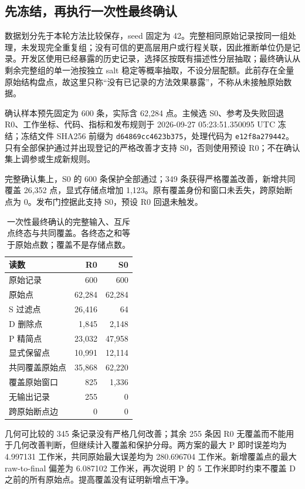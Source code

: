 \subsection{先冻结，再执行一次性最终确认}
数据划分先于本轮方法比较保存，seed 固定为 42。完整相同原始记录按同一组处理，未发现完全重复组；没有可信的更高层用户或行程关联，因此推断单位仍是记录。开发区使用已经暴露的历史记录，选择区按既有描述性分层抽取；最终确认从剩余完整组的单一池按独立 salt 稳定等概率抽取，不设分层配额。此前存在全量原始结构盘点，故这里只称“没有已记录的方法效果暴露”，不称从未接触原始数据。

确认样本预先固定为 600 条，实际含 62,284 点。主候选 S0、参考及失败回退 R0、工作坐标、代码、指标和发布规则于 2026-09-27 05:23:51.350095 UTC 冻结；冻结文件 SHA256 前缀为 \texttt{d64869cc4623b375}，处理代码为 \texttt{e12f8a279442}。只有全部保护通过并出现登记的严格改善才支持 S0，否则使用预设 R0；不在确认集上调参或生成新规则。

\begin{finding}
完整确认集上，S0 的 600 条保护全部通过；349 条获得严格覆盖改善，新增共同覆盖 26,352 点，显式存储点增加 1,123。原有覆盖身份和窗口未丢失，跨原始断点为 0。发布门控据此支持 S0，预设 R0 回退未触发。
\end{finding}
\begin{table}[H]\centering\small
\caption{一次性最终确认的完整输入、互斥点终态与共同覆盖。各终态之和等于原始点数；覆盖不是存储点数。}
\begin{tabularx}{\linewidth}{@{}Yrr@{}}\toprule 读数 & R0 & S0 \\ \midrule
原始记录 & 600 & 600 \\
原始点 & 62,284 & 62,284 \\
S 过滤点 & 26,416 & 64 \\
D 删除点 & 1,845 & 2,148 \\
P 精简点 & 23,032 & 47,958 \\
显式保留点 & 10,991 & 12,114 \\
共同覆盖原始点 & 35,868 & 62,220 \\
覆盖原始窗口 & 825 & 1,336 \\
无输出记录 & 255 & 0 \\
跨原始断点边 & 0 & 0 \\
\bottomrule\end{tabularx}\end{table}

几何可比较的 345 条记录没有严格几何改善；其余 255 条因 R0 无覆盖而不能用于几何改善判断，但继续计入覆盖和保护分母。两方案的最大 P 即时误差均为 4.997131 工作米，共同原始最大误差均为 280.696704 工作米。新增覆盖点的最大 raw-to-final 偏差为 6.087102 工作米，再次说明 P 的 5 工作米即时约束不覆盖 D 之前的所有原始点。提高覆盖没有证明新增点干净。

